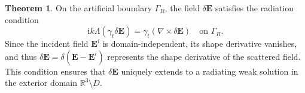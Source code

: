 \documentclass[12pt,reqno]{amsart}
\theoremstyle{definition}
\newtheorem{theo}{Theorem}[section]
\numberwithin{equation}{section}
\begin{document}
\begin{theo}
On the artificial boundary $\Gamma_R$, the field $\delta\mathbf{E}$ satisfies the radiation condition
\begin{equation}
\label{eq:silver_muller_radiation}
\mathrm{i}k \Lambda(\gamma_t \delta\mathbf{E}) = \gamma_t(\nabla \times \delta\mathbf{E}) \quad \text{on } \Gamma_R.
\end{equation}
Since the incident field $\mathbf{E}^i$ is domain-independent, its shape derivative vanishes, and thus $\delta\mathbf{E} = \delta(\mathbf{E} - \mathbf{E}^i)$ represents the shape derivative of the scattered field. This condition ensures that $\delta\mathbf{E}$ uniquely extends to a radiating weak solution in the exterior domain $\mathbb{R}^3 \setminus \overline{D}$.
\end{theo}
\end{document}
